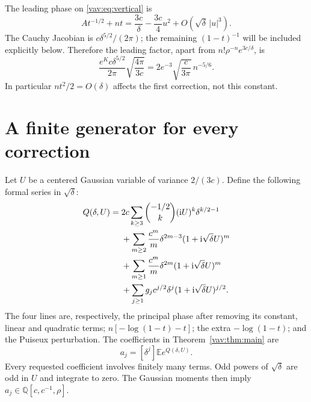 \documentclass[11pt]{article}
\theoremstyle{remark}\newtheorem{remark}[theorem]{Remark}
\newcommand{\E}{\mathbb E}
\newcommand{\ii}{\mathrm i}
\begin{document}
The leading phase on \eqref{vav:eq:vertical} is
\begin{equation}\label{vav:eq:phase}
 A t^{-1/2}+nt=\frac{3c}\delta-\frac{3c}{4}u^2
                        +O(\sqrt\delta\,|u|^3).
\end{equation}
The Cauchy Jacobian is $c\delta^{5/2}/(2\pi)$; the remaining
$(1-t)^{-1}$ will be included explicitly below. Therefore the leading
factor, apart from $n!\rho^{-n}e^{3c/\delta}$, is
\begin{equation}\label{vav:eq:prefactor}
 \frac{e^Kc\delta^{5/2}}{2\pi}\sqrt{\frac{4\pi}{3c}}
     =2e^{-3}\sqrt{\frac c{3\pi}}\,n^{-5/6}.
\end{equation}
In particular $nt^2/2=O(\delta)$ affects the first correction, not
this constant.

\section{A finite generator for every correction}\label{vav:sec:generator}

Let $U$ be a centered Gaussian variable of variance $2/(3c)$.
Define the following formal series in $\sqrt\delta$:
\begin{align}
 Q(\delta,U)={}&2c\sum_{k\ge3}\binom{-1/2}{k}
                      (\ii U)^k\delta^{k/2-1}\notag\\
 &+\sum_{m\ge2}\frac{c^m}{m}\delta^{2m-3}
                      (1+\ii\sqrt\delta U)^m\notag\\
 &+\sum_{m\ge1}\frac{c^m}{m}\delta^{2m}
                      (1+\ii\sqrt\delta U)^m\notag\\
 &+\sum_{j\ge1}g_jc^{j/2}\delta^j
                      (1+\ii\sqrt\delta U)^{j/2}.
 \label{vav:eq:Q}
\end{align}
The four lines are, respectively, the principal phase after removing
its constant, linear and quadratic terms;
$n[-\log(1-t)-t]$; the extra $-\log(1-t)$; and the Puiseux perturbation.
The coefficients in Theorem~\ref{vav:thm:main} are
\begin{equation}\label{vav:eq:gaussian}
 a_j=[\delta^j]\E e^{Q(\delta,U)}.
\end{equation}
Every requested coefficient involves finitely many terms. Odd powers
of $\sqrt\delta$ are odd in $U$ and integrate to zero. The Gaussian
moments then imply $a_j\in\mathbb Q[c,c^{-1},\rho]$.
\end{document}
